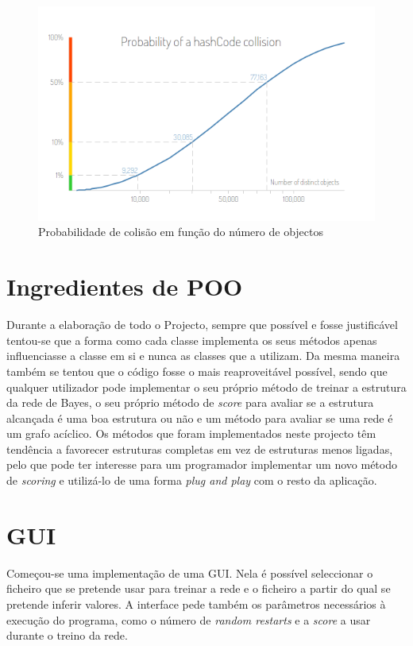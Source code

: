 \documentclass[a4paper]{article}
\begin{document}
      
	\begin{figure}[h]
    	\centering
		\includegraphics[width=.8\textwidth]{img/hashcode-collisions.png}
        \caption{Probabilidade de colisão em função do número de objectos}
        \label{fig:hashset_colisions}
	\end{figure}



	\section{Ingredientes de POO}

	Durante a elaboração de todo o Projecto, sempre que possível e fosse justificável tentou-se que a forma como cada classe implementa os seus métodos apenas influenciasse a classe em si e nunca as classes que a utilizam. Da mesma maneira também se tentou que o código fosse o mais reaproveitável possível, sendo que qualquer utilizador pode implementar o seu próprio método de treinar a estrutura da rede de Bayes, o seu próprio método de \textit{score} para avaliar se a estrutura alcançada é uma boa estrutura ou não e um método para avaliar se uma rede é um grafo acíclico. Os métodos que foram implementados neste projecto têm tendência a favorecer estruturas completas em vez de estruturas menos ligadas, pelo que pode ter interesse para um programador implementar um novo método de \textit{scoring} e utilizá-lo de uma forma \textit{plug and play} com o resto da aplicação.


	\section{GUI}
    
    Começou-se uma implementação de uma GUI. Nela é possível seleccionar o ficheiro que se pretende usar para treinar a rede e o ficheiro a partir do qual se pretende inferir valores. A interface pede também os parâmetros necessários à execução do programa, como o número de \textit{random restarts} e a \textit{score} a usar durante o treino da rede.
    
\end{document}
